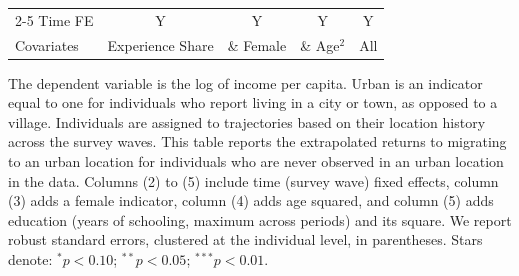 \begin{table}[htbp]
\begin{threeparttable}
\begin{tabular}{l cccc}
\cmidrule{2-5} Time FE & Y & Y & Y & Y \\ Covariates & Experience Share & \& Female & \& Age$^2$ & All \\ \bottomrule \end{tabular} \begin{tablenotes}[flushleft] \footnotesize \item{The dependent variable is the log of income per capita. Urban is an indicator equal to one for individuals who report living in a city or town, as opposed to a village. Individuals are assigned to trajectories based on their location history across the survey waves. This table reports the extrapolated returns to migrating to an urban location for individuals who are never observed in an urban location in the data. Columns (2) to (5) include time (survey wave) fixed effects, column (3) adds a female indicator, column (4) adds age squared, and column (5) adds education (years of schooling, maximum across periods) and its square. We report robust standard errors, clustered at the individual level, in parentheses. Stars denote: $^{*} p<0.10$; $^{**} p<0.05$; $^{***} p<0.01$.} \end{tablenotes} \end{threeparttable} \end{table}
